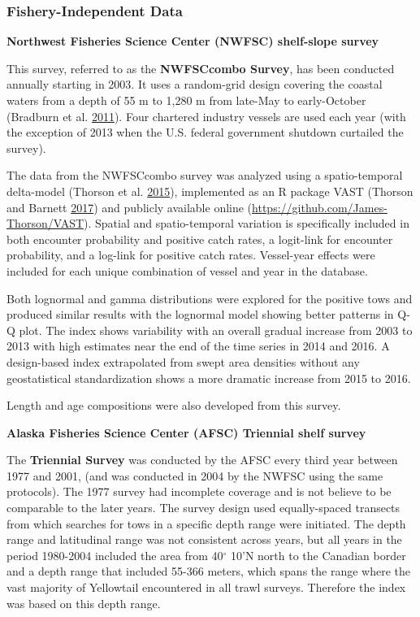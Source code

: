 \documentclass[12pt,]{article}
\begin{document}
\subsubsection{Fishery-Independent Data}\label{fishery-independent-data}

\textbf{Northwest Fisheries Science Center (NWFSC) shelf-slope survey}

This survey, referred to as the \textbf{NWFSCcombo Survey}, has been
conducted annually starting in 2003. It uses a random-grid design
covering the coastal waters from a depth of 55 m to 1,280 m from
late-May to early-October (Bradburn et al.
\protect\hyperlink{ref-Bradburn2011}{2011}). Four chartered industry
vessels are used each year (with the exception of 2013 when the U.S.
federal government shutdown curtailed the survey).

The data from the NWFSCcombo survey was analyzed using a spatio-temporal
delta-model (Thorson et al. \protect\hyperlink{ref-Thorson2015}{2015}),
implemented as an R package VAST (Thorson and Barnett
\protect\hyperlink{ref-Thorson2017}{2017}) and publicly available online
(\url{https://github.com/James-Thorson/VAST}). Spatial and
spatio-temporal variation is specifically included in both encounter
probability and positive catch rates, a logit-link for encounter
probability, and a log-link for positive catch rates. Vessel-year
effects were included for each unique combination of vessel and year in
the database.

Both lognormal and gamma distributions were explored for the positive
tows and produced similar results with the lognormal model showing
better patterns in Q-Q plot. The index shows variability with an overall
gradual increase from 2003 to 2013 with high estimates near the end of
the time series in 2014 and 2016. A design-based index extrapolated from
swept area densities without any geostatistical standardization shows a
more dramatic increase from 2015 to 2016.

Length and age compositions were also developed from this survey.

\textbf{Alaska Fisheries Science Center (AFSC) Triennial shelf survey}

The \textbf{Triennial Survey} was conducted by the AFSC every third year
between 1977 and 2001, (and was conducted in 2004 by the NWFSC using the
same protocols). The 1977 survey had incomplete coverage and is not
believe to be comparable to the later years. The survey design used
equally-spaced transects from which searches for tows in a specific
depth range were initiated. The depth range and latitudinal range was
not consistent across years, but all years in the period 1980-2004
included the area from 40\(^\circ\) 10'N north to the Canadian border
and a depth range that included 55-366 meters, which spans the range
where the vast majority of Yellowtail encountered in all trawl surveys.
Therefore the index was based on this depth range.
\end{document}
